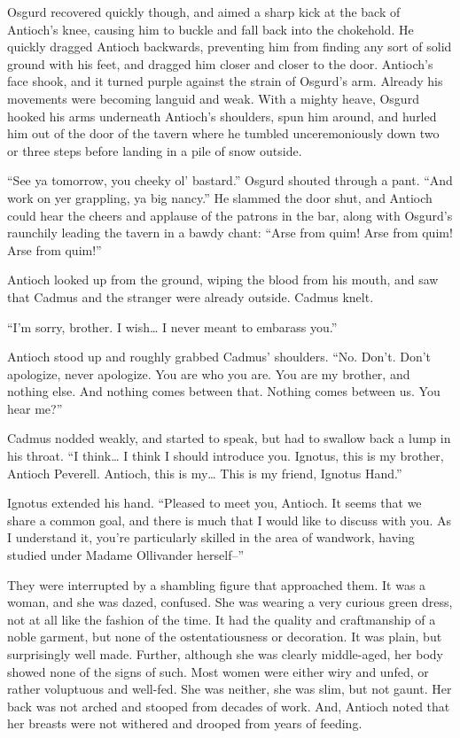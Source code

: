Osgurd recovered quickly though, and aimed a sharp kick at the back of Antioch’s knee, causing him to buckle and fall back into the chokehold. He quickly dragged Antioch backwards, preventing him from finding any sort of solid ground with his feet, and dragged him closer and closer to the door. Antioch’s face shook, and it turned purple against the strain of Osgurd’s arm. Already his movements were becoming languid and weak. With a mighty heave, Osgurd hooked his arms underneath Antioch’s shoulders, spun him around, and hurled him out of the door of the tavern where he tumbled unceremoniously down two or three steps before landing in a pile of snow outside.

“See ya tomorrow, you cheeky ol’ bastard.” Osgurd shouted through a pant. “And work on yer grappling, ya big nancy.” He slammed the door shut, and Antioch could hear the cheers and applause of the patrons in the bar, along with Osgurd’s raunchily leading the tavern in a bawdy chant: “Arse from quim! Arse from quim! Arse from quim!”

Antioch looked up from the ground, wiping the blood from his mouth, and saw that Cadmus and the stranger were already outside. Cadmus knelt.

“I’m sorry, brother. I wish… I never meant to embarass you.”

Antioch stood up and roughly grabbed Cadmus’ shoulders. “No. Don’t. Don’t apologize, never apologize. You are who you are. You are my brother, and nothing else. And nothing comes between that. Nothing comes between us. You hear me?”

Cadmus nodded weakly, and started to speak, but had to swallow back a lump in his throat. “I think… I think I should introduce you. Ignotus, this is my brother, Antioch Peverell. Antioch, this is my… This is my friend, Ignotus Hand.”

Ignotus extended his hand. “Pleased to meet you, Antioch. It seems that we share a common goal, and there is much that I would like to discuss with you. As I understand it, you’re particularly skilled in the area of wandwork, having studied under Madame Ollivander herself–”

They were interrupted by a shambling figure that approached them. It was a woman, and she was dazed, confused. She was wearing a very curious green dress, not at all like the fashion of the time. It had the quality and craftmanship of a noble garment, but none of the ostentatiousness or decoration. It was plain, but surprisingly well made. Further, although she was clearly middle-aged, her body showed none of the signs of such. Most women were either wiry and unfed, or rather voluptuous and well-fed. She was neither, she was slim, but not gaunt. Her back was not arched and stooped from decades of work. And, Antioch noted that her breasts were not withered and drooped from years of feeding.

